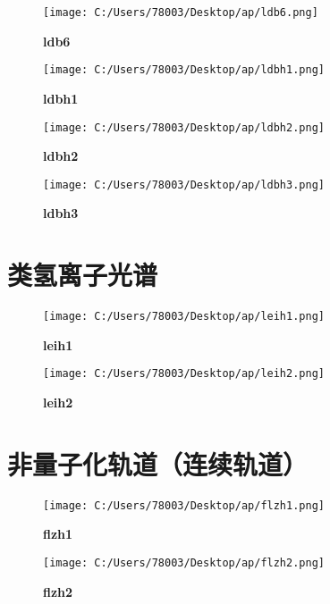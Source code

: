 \documentclass[UTF8]{report}
\theoremstyle{MyLineTheoremStyle} %
\theoremstyle{MyBlockTheoremStyle} %
\theoremstyle{MySubsubsectionStyle} %
\begin{document}
\begin{figure}[ht]
    \centering
    \texttt{[image: C:/Users/78003/Desktop/ap/ldb6.png]}
    \caption{\textbf{ldb6}}
    \label{fig:ldb6}
\end{figure}

\begin{figure}[ht]
    \centering
    \texttt{[image: C:/Users/78003/Desktop/ap/ldbh1.png]}
    \caption{\textbf{ldbh1}}
    \label{fig:ldbh1}
\end{figure}

\begin{figure}[ht]
    \centering
    \texttt{[image: C:/Users/78003/Desktop/ap/ldbh2.png]}
    \caption{\textbf{ldbh2}}
    \label{fig:ldbh2}
\end{figure}

\begin{figure}[ht]
    \centering
    \texttt{[image: C:/Users/78003/Desktop/ap/ldbh3.png]}
    \caption{\textbf{ldbh3}}
    \label{fig:ldbh3}
\end{figure}

\cleardoublepage
\section{类氢离子光谱}

\begin{figure}[ht]
    \centering
    \texttt{[image: C:/Users/78003/Desktop/ap/leih1.png]}
    \caption{\textbf{leih1}}
    \label{fig:leih1}
\end{figure}

\begin{figure}[ht]
    \centering
    \texttt{[image: C:/Users/78003/Desktop/ap/leih2.png]}
    \caption{\textbf{leih2}}
    \label{fig:leih2}
\end{figure}

\cleardoublepage
\section{非量子化轨道（连续轨道）}

\begin{figure}[ht]
    \centering
    \texttt{[image: C:/Users/78003/Desktop/ap/flzh1.png]}
    \caption{\textbf{flzh1}}
    \label{fig:flzh1}
\end{figure}

\begin{figure}[ht]
    \centering
    \texttt{[image: C:/Users/78003/Desktop/ap/flzh2.png]}
    \caption{\textbf{flzh2}}
    \label{fig:flzh2}
\end{figure}
\end{document}
